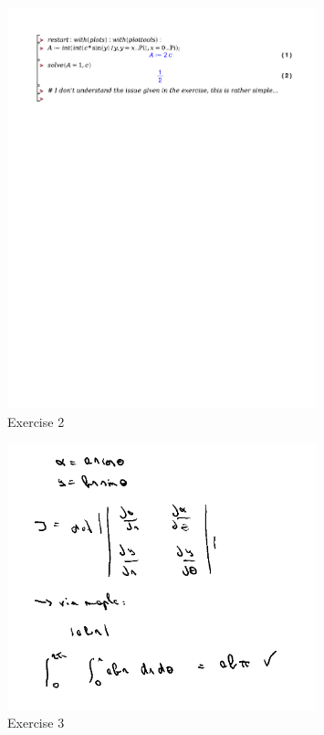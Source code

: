\documentclass[a4paper]{report}
\begin{document}
\begin{figure}[H]
	\centering
	\includegraphics[width=0.8\textwidth]{exercises/wc_5_ex_2.pdf}
	\caption{Exercise 2}
	\label{fig:wc_5_ex_2}
\end{figure}

\begin{figure}[H]
	\centering
	\includegraphics[width=0.8\textwidth]{assets/wc_5_ex_3.png}
	\caption{Exercise 3}
	\label{fig:wc_5_ex_3}
\end{figure}
\end{document}
